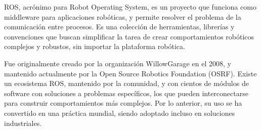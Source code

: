 ROS\cite{ROS:2009}, acrónimo para Robot Operating System, es un proyecto que funciona como middleware para aplicaciones robóticas, y permite resolver el problema de la comunicación entre procesos. Es una colección de herramientas, librerías y convenciones que buscan simplificar la tarea de crear comportamientos robóticos complejos y robustos, sin importar la plataforma robótica.

Fue originalmente creado por la organización WillowGarage en el 2008, y mantenido actualmente por la Open Source Robotics Foundation (OSRF). Existe un ecosistema ROS, mantenido por la comunidad, y con cientos de módulos de software con soluciones a problemas específicos, los que pueden interconectarse para construir comportamientos más complejos. Por lo anterior, su uso se ha convertido en una práctica mundial, siendo adoptado incluso en soluciones industriales.


%
%
%
%
%





